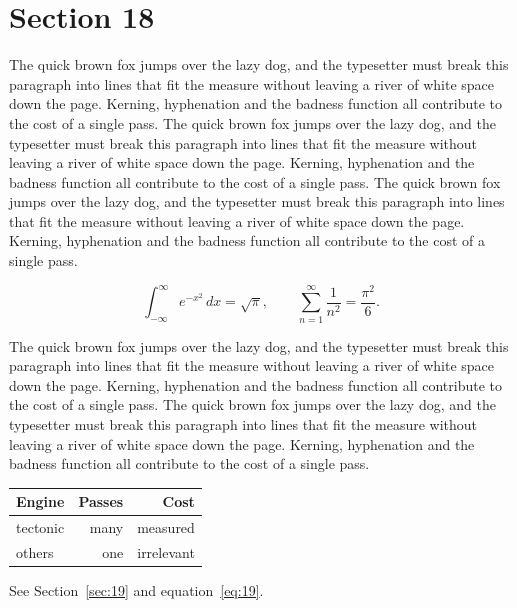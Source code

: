 \documentclass{article}
\begin{document}
\section{Section 18}
\label{sec:18}
The quick brown fox jumps over the lazy dog, and the typesetter must break this paragraph into lines that fit the measure without leaving a river of white space down the page. Kerning, hyphenation and the badness function all contribute to the cost of a single pass. The quick brown fox jumps over the lazy dog, and the typesetter must break this paragraph into lines that fit the measure without leaving a river of white space down the page. Kerning, hyphenation and the badness function all contribute to the cost of a single pass. The quick brown fox jumps over the lazy dog, and the typesetter must break this paragraph into lines that fit the measure without leaving a river of white space down the page. Kerning, hyphenation and the badness function all contribute to the cost of a single pass. 

\begin{equation}\label{eq:18}
\int_{-\infty}^{\infty} e^{-x^{2}}\,dx = \sqrt{\pi}, \qquad
\sum_{n=1}^{\infty} \frac{1}{n^{2}} = \frac{\pi^{2}}{6}.
\end{equation}

The quick brown fox jumps over the lazy dog, and the typesetter must break this paragraph into lines that fit the measure without leaving a river of white space down the page. Kerning, hyphenation and the badness function all contribute to the cost of a single pass. The quick brown fox jumps over the lazy dog, and the typesetter must break this paragraph into lines that fit the measure without leaving a river of white space down the page. Kerning, hyphenation and the badness function all contribute to the cost of a single pass. 

\begin{center}
\begin{tabular}{lrr}
\toprule
Engine & Passes & Cost \\
\midrule
tectonic & many & measured \\
others & one & irrelevant \\
\bottomrule
\end{tabular}
\end{center}

See Section~\ref{sec:19} and equation~\eqref{eq:19}.
\end{document}
